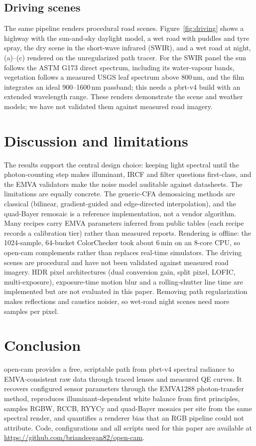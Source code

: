 \documentclass[letterpaper,twocolumn,fleqn]{article}
\begin{document}
\subsection{Driving scenes}
The same pipeline renders procedural road scenes. Figure~\ref{fig:driving} shows a highway with the sun-and-sky daylight model, a wet road with puddles and tyre spray, the dry scene in the short-wave infrared (SWIR), and a wet road at night, (a)--(c) rendered on the unregularized path tracer. For the SWIR panel the sun follows the ASTM G173 direct spectrum, including its water-vapour bands, vegetation follows a measured USGS leaf spectrum above 800\,nm, and the film integrates an ideal 900--1600\,nm passband; this needs a pbrt-v4 build with an extended wavelength range. These renders demonstrate the scene and weather models; we have not validated them against measured road imagery.


\section{Discussion and limitations}
The results support the central design choice: keeping light spectral until the photon-counting step makes illuminant, IRCF and filter questions first-class, and the EMVA validators make the noise model auditable against datasheets. The limitations are equally concrete. The generic-CFA demosaicing methods are classical (bilinear, gradient-guided and edge-directed interpolation), and the quad-Bayer remosaic is a reference implementation, not a vendor algorithm. Many recipes carry EMVA parameters inferred from public tables (each recipe records a calibration tier) rather than measured reports. Rendering is offline: the 1024-sample, 64-bucket ColorChecker took about 6\,min on an 8-core CPU, so open-cam complements rather than replaces real-time simulators. The driving scenes are procedural and have not been validated against measured road imagery. HDR pixel architectures (dual conversion gain, split pixel, LOFIC, multi-exposure), exposure-time motion blur and a rolling-shutter line time are implemented but are not evaluated in this paper. Removing path regularization makes reflections and caustics noisier, so wet-road night scenes need more samples per pixel.

\section{Conclusion}
open-cam provides a free, scriptable path from pbrt-v4 spectral radiance to EMVA-consistent raw data through traced lenses and measured QE curves. It recovers configured sensor parameters through the EMVA1288 photon-transfer method, reproduces illuminant-dependent white balance from first principles, samples RGBW, RCCB, RYYCy and quad-Bayer mosaics per site from the same spectral render, and quantifies a renderer bias that an RGB pipeline could not attribute. Code, configurations and all scripts used for this paper are available at \url{https://github.com/briandeegan82/open-cam}.
\end{document}
